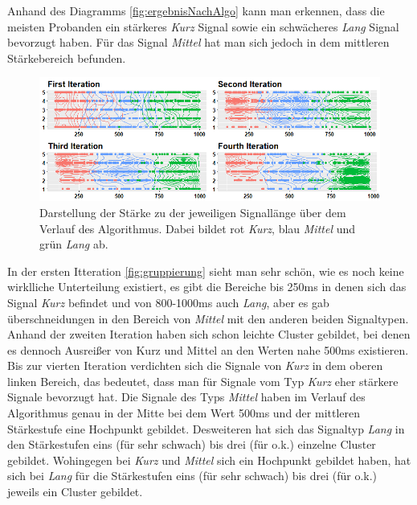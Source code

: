 Anhand des Diagramms \autoref{fig:ergebnisNachAlgo} kann man erkennen, dass die meisten Probanden ein st{\"a}rkeres \textit{Kurz} Signal sowie ein schw{\"a}cheres \textit{Lang} Signal bevorzugt haben. F{\"u}r das Signal \textit{Mittel} hat man sich jedoch in dem mittleren St{\"a}rkebereich befunden.

\begin{figure}[htbp] 
            \centering
   	\includegraphics[width=\textwidth]{pics/analyse/algo/gruppierung.png}
	\caption{Darstellung der St{\"a}rke zu der jeweiligen Signall{\"a}nge {\"u}ber dem Verlauf des Algorithmus. Dabei bildet rot \textit{Kurz}, blau \textit{Mittel} und gr{\"u}n \textit{Lang} ab.}
	\label{fig:gruppierung}
\end{figure}

In der ersten Itteration \autoref{fig:gruppierung} sieht man sehr sch{\"o}n, wie es noch keine wirklliche Unterteilung existiert, es gibt die Bereiche bis 250ms in denen sich das Signal \textit{Kurz} befindet und von 800-1000ms auch \textit{Lang}, aber es gab {\"u}berschneidungen in den Bereich von \textit{Mittel} mit den anderen beiden Signaltypen. 
Anhand der zweiten Iteration haben sich schon leichte Cluster gebildet, bei denen es dennoch Ausrei{\ss}er von Kurz und Mittel an den Werten nahe 500ms existieren. 
Bis zur vierten Iteration verdichten sich die Signale von \textit{Kurz} in dem oberen linken Bereich, das bedeutet, dass man f{\"u}r Signale vom Typ \textit{Kurz} eher st{\"a}rkere Signale bevorzugt hat. 
Die Signale des Typs \textit{Mittel} haben im Verlauf des Algorithmus genau in der Mitte bei dem Wert 500ms und der mittleren St{\"a}rkestufe eine Hochpunkt gebildet. 
Desweiteren hat sich das Signaltyp \textit{Lang} in den St{\"a}rkestufen eins (f{\"u}r sehr schwach) bis drei (f{\"u}r o.k.) einzelne Cluster gebildet. 
Wohingegen bei \textit{Kurz} und \textit{Mittel} sich ein Hochpunkt gebildet haben, hat sich bei \textit{Lang} f{\"u}r die St{\"a}rkestufen eins (f{\"u}r sehr schwach) bis drei (f{\"u}r o.k.) jeweils ein Cluster gebildet.

